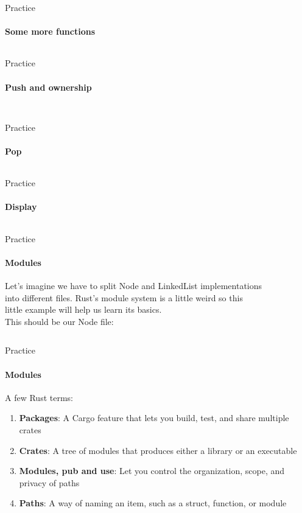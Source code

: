 \documentclass[usenames,dvipsnames,10pt,aspectratio=169]{beamer}
\begin{document}
\begin{frame}{Practice}
\framesubtitle{Some more functions}
\inputminted[fontsize=\large]{rust}{code/list5.rs}
\end{frame}

\begin{frame}{Practice}
	\framesubtitle{Push and ownership}
\inputminted[fontsize=\normalsize]{rust}{code/list6.rs}
\vspace{0.5cm}
\inputminted[fontsize=\normalsize]{rust}{code/list7.rs}
\end{frame}

\begin{frame}{Practice}
	\framesubtitle{Pop}
\inputminted[fontsize=\large]{rust}{code/list8.rs}
\end{frame}

\begin{frame}{Practice}
	\framesubtitle{Display}
\inputminted[fontsize=\normalsize]{rust}{code/list9.rs}
\end{frame}

\begin{frame}{Practice}
	\framesubtitle{Modules}	
	Let's imagine we have to split Node and LinkedList implementations\\
	into different files. Rust's module system is a little weird so this\\
	little example will help us learn its basics.\\

	\vspace{0.3cm}
	This should be our Node file:
	\vspace{0.3cm}
	\inputminted[fontsize=\normalsize]{rust}{code/list10.rs}
\end{frame}

\begin{frame}{Practice}
	\framesubtitle{Modules}	
	\large
	A few Rust terms:
	\begin{enumerate}
		\item \textbf{Packages}: A Cargo feature that lets
			you build, test, and share multiple crates
		\item \textbf{Crates}: A tree of modules that 
			produces either a library or an executable
		\item \textbf{Modules, pub and use}: Let you control the organization, scope, and privacy of paths
		\item \textbf{Paths}: A way of naming an item, such as a struct, function, or module
	\end{enumerate}
\end{frame}
\end{document}
